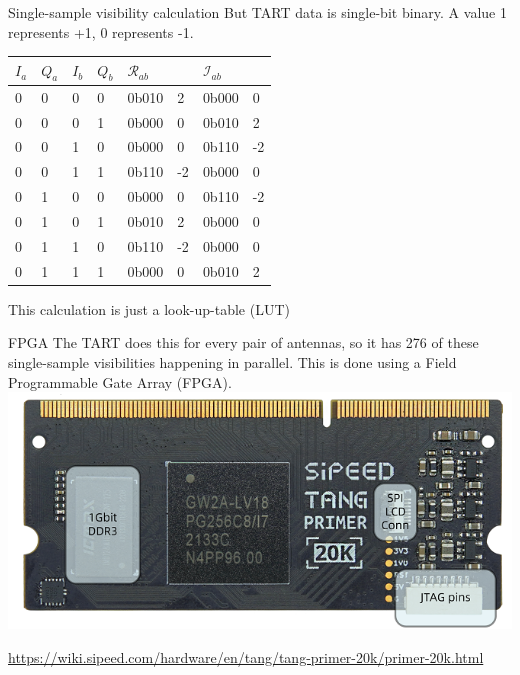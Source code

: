 \documentclass[ignorenonframetext]{beamer}
\begin{document}
\begin{frame}{Single-sample visibility calculation}
But TART data is single-bit binary. A value 1 represents +1, 0 represents -1.
\begin{center}
\begin{tabular}{llllllll}
$I_a$ & $Q_a$ & $I_b$ & $Q_b$ &  $\mathcal{R}_{ab}$ &    & $\mathcal{I}_{ab}$ &    \\
\hline
 0     & 0     & 0     & 0     &   0b010              & 2  & 0b000              & 0  \\
 0     & 0     & 0     & 1     &   0b000              & 0  & 0b010              & 2  \\
 0     & 0     & 1     & 0     &   0b000              & 0  & 0b110              & -2 \\
 0     & 0     & 1     & 1     &   0b110              & -2 & 0b000              & 0  \\
 0     & 1     & 0     & 0     &   0b000              & 0  & 0b110              & -2 \\
 0     & 1     & 0     & 1     &   0b010              & 2  & 0b000              & 0  \\
 0     & 1     & 1     & 0     &   0b110              & -2 & 0b000              & 0  \\
 0     & 1     & 1     & 1     &   0b000              & 0  & 0b010              & 2  
\end{tabular}
\end{center}
This calculation is just a look-up-table (LUT)
\end{frame}

\begin{frame}{FPGA}
 The TART does this for every pair of antennas, so it has 276 of these single-sample visibilities happening in parallel. This is done using a Field Programmable Gate Array (FPGA).
\centering\includegraphics[width=0.7\linewidth]{20k_front.png}
 
 \url{https://wiki.sipeed.com/hardware/en/tang/tang-primer-20k/primer-20k.html}
\end{frame}
\end{document}

